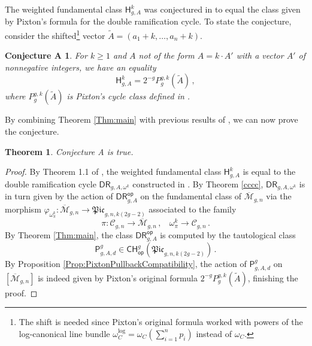 \documentclass[a4paper,12pt]{article} %
\def\P{\mathsf{P}}
\def\cM{{\mathcal{M}}}
\theoremstyle{definition}
\theoremstyle{plain}%
\newtheorem*{conjectureA}{Conjecture A}
\newtheorem{theorem}[definition]{Theorem}
\renewcommand{\phi}{\varphi}
\newcommand{\Picabs}{\mathfrak{Pic}}
\begin{document}
The weighted fundamental class 
$\mathsf{H}^k_{g,A}$
was conjectured in \cite{Farkas2016The-moduli-spac, Schmitt2016Dimension-theor}
to equal  the class given by Pixton's formula for the double ramification cycle. To state the conjecture, consider the shifted\footnote{The shift is needed since Pixton's original formula worked with powers of the log-canonical line bundle $\omega_C^{\text{log}} = \omega_C(\sum_{i=1}^n p_i)$ instead of $\omega_C$.} vector $\widetilde A = (a_1 + k, \ldots, a_n +k)$.

\begin{conjectureA}
For $k \geq 1$ and $A$ not of the form $A = k \cdot A'$ with a vector $A'$ of nonnegative integers, we have an equality
\[\mathsf{H}^k_{g,A} = 2^{-g} P_g^{g,k}(\widetilde A)\, ,\]
where $P_g^{g,k}(\widetilde A)$ is Pixton's cycle class defined in \cite[Section 1.1]{Janda2016Double-ramifica}.
\end{conjectureA}

\noindent By combining Theorem \ref{Thm:main}  with previous results of \cite{Holmes2019Infinitesimal-s}, we can now prove the conjecture.

\begin{theorem}\label{FPA}
Conjecture A is true.
\end{theorem}
\begin{proof}
By Theorem 1.1 of \cite{Holmes2019Infinitesimal-s}, the weighted fundamental class $\mathsf{H}^k_{g,A}$ is equal to the double ramification cycle $\mathsf{DR}_{g,A, \omega^k}$ constructed in \cite{Holmes2017Extending-the-d}. By Theorem \ref{cccc},
$\mathsf{DR}_{g,A, \omega^k}$
is in turn given by the action of $\mathsf{DR}^{\mathsf{op}}_{g,A}$ on the fundamental class
of $\overline{\mathcal{M}}_{g,n}$ via the morphism $\phi_{\omega_\pi^k}: \overline{\mathcal{M}}_{g,n} \to \Picabs_{g,n,k(2g-2)}$ associated to the family
\begin{equation*}
\pi: \mathcal{C}_{g,n} \rightarrow \overline{\cM}_{g,n}\, , \ \ \ \ \omega_\pi^{k} \rightarrow \mathcal{C}_{g,n}\, .
\end{equation*}
By Theorem \ref{Thm:main}, the class $\mathsf{DR}^{\mathsf{op}}_{g,A}$ is computed by the tautological class
$$\P_{g,A,d}^g \in {\mathsf{CH}}^g_{\mathsf{op}}(\Picabs_{g,n,k(2g-2)})\, . $$ By Proposition \ref{Prop:PixtonPullbackCompatibility}, the action of $\P_{g,A,d}^g$ on $[\overline{\mathcal{M}}_{g,n}]$ is indeed given by Pixton's original formula $ 2^{-g} P_g^{g,k}(\widetilde A)$, finishing the proof. \end{proof}
\end{document}
